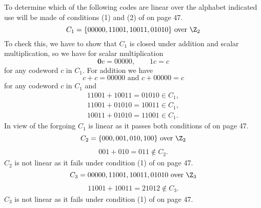 To determine which of the following codes are linear over the alphabet
indicated use will be made of conditions (1) and (2) of \hill on page 47.
\qsubpart
\[
	C_1 = \{00000, 11001, 10011, 01010\} \textrm{\ over\ } \Z_2
\]
To check this, we have to show that $C_1$ is closed under addition and scalar multiplication, so we have for scalar multiplication
\[
	\textbf{0}c = 00000,\qquad 1c = c
\]
for any codeword $c$ in $C_1$. For addition we have
\[
	c + c = 00000 \textrm{\ and\ } c + 00000 = c
\]
for any codeword $c$ in $C_1$ and
\begin{align*}
	11001 + 10011 = 01010 \in C_1,\\
	11001 + 01010 = 10011 \in C_1,\\
	10011 + 01010 = 11001 \in C_1.
\end{align*}
In view of the forgoing $C_1$ is linear as it passes both conditions of \hill on page 47.
\qsubpart
\[
	C_2 = \{000, 001, 010, 100\} \textrm{\ over\ } \Z_2
\]
\begin{align*}
	 001 + 010 = 011 \not\in C_2.
\end{align*}
$C_2$ is not linear as it fails under condition (1) of \hill on page 47.
\qsubpart
\[
	C_3 = {00000, 11001, 10011, 01010} \textrm{\ over\ } \Z_3
\]
\begin{align*}
	11001 + 10011 = 21012 \not\in C_3.
\end{align*}
$C_3$ is not linear as it fails under condition (1) of \hill on page 47.